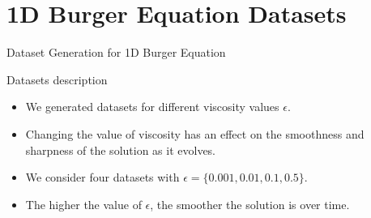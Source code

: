 \section{1D Burger Equation Datasets}

\begin{secframe}
\small
\textcolor{red_unipd}{\Large Dataset Generation for 1D Burger Equation}

\vspace{0.6em}

\begin{block}{Datasets description}
\begin{itemize}
    \item We generated datasets for different viscosity values $\epsilon$.
    \item Changing the value of viscosity has an effect on the smoothness and sharpness of the solution as it evolves.
    \item We consider four datasets with $\epsilon = \{0.001, 0.01, 0.1, 0.5\}$.
    \item The higher the value of $\epsilon$, the smoother the solution is over time.
\end{itemize}
\end{block}

\end{secframe}

